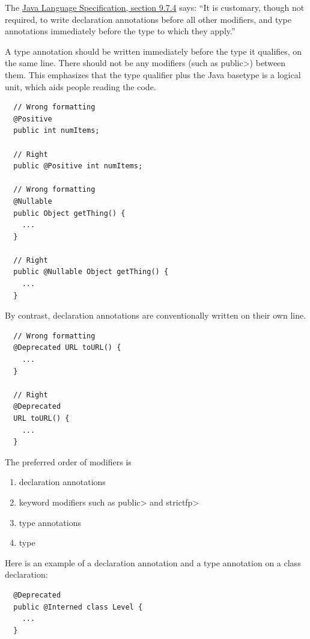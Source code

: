 The
\href{https://docs.oracle.com/javase/specs/jls/se8/html/jls-9.html#jls-9.7.4}{Java
  Language Specification, section 9.7.4} says:  ``It is customary, though
not required, to write declaration annotations before all other modifiers,
and type annotations immediately before the type to which they apply.''

A type annotation should be written immediately before the type it
qualifies, on the same line.  There should not be any modifiers (such as
\<public>) between them.  This emphasizes that the type qualifier plus the
Java basetype is a logical unit, which aids people reading the code.

\begin{Verbatim}
  // Wrong formatting
  @Positive
  public int numItems;

  // Right
  public @Positive int numItems;

  // Wrong formatting
  @Nullable
  public Object getThing() {
    ...
  }

  // Right
  public @Nullable Object getThing() {
    ...
  }
\end{Verbatim}

By contrast, declaration annotations are conventionally written on their own line.

\begin{Verbatim}
  // Wrong formatting
  @Deprecated URL toURL() {
    ...
  }

  // Right
  @Deprecated
  URL toURL() {
    ...
  }
\end{Verbatim}

The preferred order of modifiers is
\begin{enumerate}
\item declaration annotations
\item keyword modifiers such as \<public> and \<strictfp>
\item type annotations
\item type
\end{enumerate}

Here is an example of a declaration annotation and a type annotation on a class declaration:

\begin{Verbatim}
  @Deprecated
  public @Interned class Level {
    ...
  }
\end{Verbatim}

%
%
%
%

